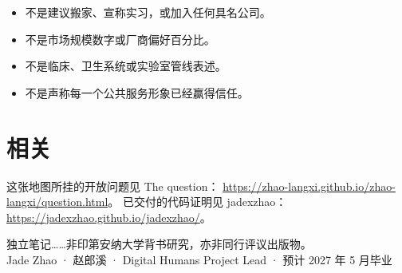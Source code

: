 \documentclass[11pt,a4paper]{ctexart}
\begin{document}
\begin{itemize}
  \item 不是建议搬家、宣称实习，或加入任何具名公司。
  \item 不是市场规模数字或厂商偏好百分比。
  \item 不是临床、卫生系统或实验室管线表述。
  \item 不是声称每一个公共服务形象已经赢得信任。
\end{itemize}

\section*{相关}

这张地图所挂的开放问题见 The question：
\url{https://zhao-langxi.github.io/zhao-langxi/question.html}。
已交付的代码证明见 jadexzhao：
\url{https://jadexzhao.github.io/jadexzhao/}。

\vspace{1.2em}
\noindent\small 独立笔记……非印第安纳大学背书研究，亦非同行评议出版物。\\
Jade Zhao · 赵郎溪 · Digital Humans Project Lead · 预计 2027 年 5 月毕业
\end{document}
